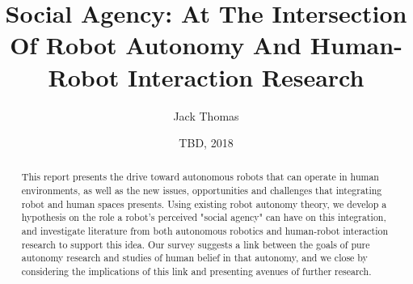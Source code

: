 \documentclass{sfuthesis}
\title{Social Agency: At The Intersection Of Robot Autonomy And Human-Robot Interaction Research}
\author{Jack Thomas}
\date{TBD, 2018}
\begin{document}
\frontmatter
\maketitle{}
\makecommittee{}

\begin{abstract}
This report presents the drive toward autonomous robots that can operate in human environments, as well as the new issues, opportunities and challenges that integrating robot and human spaces presents. Using existing robot autonomy theory, we develop a hypothesis on the role a robot's perceived "social agency" can have on this integration, and investigate literature from both autonomous robotics and human-robot interaction research to support this idea. Our survey suggests a link between the goals of pure autonomy research and studies of human belief in that autonomy, and we close by considering the implications of this link and presenting avenues of further research.


\end{abstract}





%
\tableofcontents%
\clearpage

\end{document}
